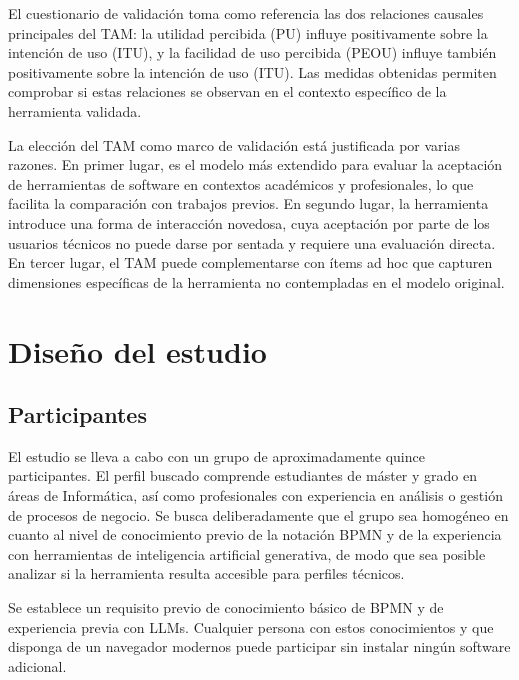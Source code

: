 El cuestionario de validación toma como referencia las dos relaciones causales principales del TAM: la utilidad percibida (PU) influye positivamente sobre la intención de uso (ITU), y la facilidad de uso percibida (PEOU) influye también positivamente sobre la intención de uso (ITU). Las medidas obtenidas permiten comprobar si estas relaciones se observan en el contexto específico de la herramienta validada.

La elección del TAM como marco de validación está justificada por varias razones. En primer lugar, es el modelo más extendido para evaluar la aceptación de herramientas de software en contextos académicos y profesionales, lo que facilita la comparación con trabajos previos. En segundo lugar, la herramienta introduce una forma de interacción novedosa, cuya aceptación por parte de los usuarios técnicos no puede darse por sentada y requiere una evaluación directa. En tercer lugar, el TAM puede complementarse con ítems ad hoc que capturen dimensiones específicas de la herramienta no contempladas en el modelo original.

\section{Diseño del estudio}
\label{sec:disenioEstudio}

\subsection{Participantes}
\label{subsec:participantes}

El estudio se lleva a cabo con un grupo de aproximadamente quince participantes. El perfil buscado comprende estudiantes de máster y grado en áreas de Informática, así como profesionales con experiencia en análisis o gestión de procesos de negocio. Se busca deliberadamente que el grupo sea homogéneo en cuanto al nivel de conocimiento previo de la notación BPMN y de la experiencia con herramientas de inteligencia artificial generativa, de modo que sea posible analizar si la herramienta resulta  accesible para perfiles técnicos.

Se establece un requisito previo de conocimiento básico de BPMN y de experiencia previa con LLMs. Cualquier persona con estos conocimientos y que disponga de un navegador modernos puede participar sin instalar ningún software adicional.

